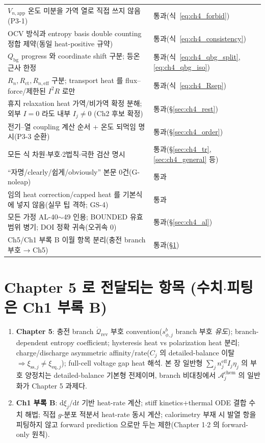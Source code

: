 \documentclass[11pt,a4paper]{article}
\newcommand{\dd}{\mathrm{d}}
\newcommand{\eff}{\mathrm{eff}}
\newcommand{\eq}{\mathrm{eq}}
\newcommand{\app}{\mathrm{app}}
\newcommand{\bg}{\mathrm{bg}}
\newcommand{\rev}{\mathrm{rev}}
\newcommand{\ct}{\mathrm{ct}}
\newcommand{\chem}{\mathrm{chem}}
\newcommand{\sstat}{\mathrm{ss}}
\begin{document}
{\begin{longtable}{>{\raggedright\arraybackslash}p{} >{\raggedright\arraybackslash}p{}}
$V_{n,\app}$ 온도 미분을 가역 열로 직접 쓰지 않음(P3-1) & 통과(식~\eqref{eq:ch4_forbid}) \\
OCV 방식과 entropy basis double counting 정합 제약(동일 heat-positive 규약) & 통과(식~\eqref{eq:ch4_consistency}) \\
$Q_\bg$ progress 와 coordinate shift 구분; 등온 근사 한정 & 통과(식~\eqref{eq:ch4_qbg_split},\eqref{eq:ch4_qbg_iso}) \\
$R_n,R_\ct,R_{n,\eff}$ 구분; transport heat 를 flux--force/제한된 $I^2R$ 로만 & 통과(식~\eqref{eq:ch4_Rsep}) \\
휴지 relaxation heat 가역/비가역 확정 분해; 외부 $I{=}0$ 라도 내부 $I_j{\ne}0$ (Ch2 후보 확정) & 통과(\S\ref{sec:ch4_rest}) \\
전기--열 coupling 계산 순서 + 온도 되먹임 명시(P3-3 순환) & 통과(\S\ref{sec:ch4_order}) \\
모든 식 차원$\cdot$부호$\cdot$2법칙$\cdot$극한 검산 명시 & 통과(\S\ref{sec:ch4_tr},\ref{sec:ch4_general} 등) \\
``자명/clearly/쉽게/obviously'' 본문 0건(G-noleap) & 통과 \\
임의 heat correction/capped heat 를 기본식에 넣지 않음(실무 팁 격하; GS-4) & 통과 \\
모든 가정 AL-40$\sim$49 인용; BOUNDED 유효범위 병기; DOI 정확 귀속(오귀속 0) & 통과(\S\ref{sec:ch4_al}) \\
Ch5/Ch1 부록 B 이월 항목 분리(충전 branch 부호 → Ch5) & 통과(\S\ref{sec:ch4_transmit}) \\
\bottomrule
\end{longtable}
}

\section{Chapter 5 로 전달되는 항목 (수치$\cdot$피팅은 Ch1 부록 B)}\label{sec:ch4_transmit}
\begin{enumerate}[label=\arabic*),leftmargin=2.0em]
\item \textbf{Chapter 5}: 충전 branch $\dot{\mathcal Q}_{\rev}$ 부호 convention($s_{\phi,j}^b$ branch 부호
  \emph{유도}); branch-dependent entropy coefficient; hysteresis heat vs polarization heat 분리;
  charge/discharge asymmetric affinity/rate($C_j$ 의 detailed-balance 이탈 $\Rightarrow\xi_{\sstat,j}\ne\xi_{\eq,j}$);
  full-cell voltage gap heat 해석. 본 장 일반형 $\sum_j n_j^{\eff}I_j\eta_j$ 의 부호 양정치는 detailed-balance
  기본형 전제이며, branch 비대칭에서 $\mathcal A_j^{\chem}$ 의 일반화가 Chapter 5 과제다.
\item \textbf{Ch1 부록 B}: $\dd\xi_j/\dd t$ 기반 heat-rate 계산; stiff kinetics$+$thermal ODE 결합 수치 해법;
  직접 $g$-분포 적분서 heat-rate 동시 계산; calorimetry 부재 시 발열 항을 피팅하지 않고 forward prediction
  으로만 두는 제한(Chapter 1$\cdot$2 의 forward-only 원칙).
\end{enumerate}
\end{document}
